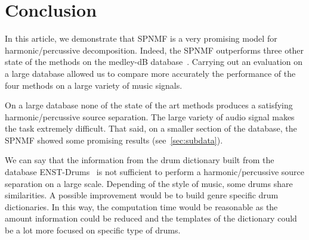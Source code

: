 \section{Conclusion}
\label{sec:conc}

In this article, we demonstrate that SPNMF is a very promising model for harmonic/percussive decomposition. Indeed, the SPNMF outperforms three other state of the methods on the medley-dB database~\cite{bittner2014medleydb}. Carrying out an evaluation on a large database allowed us to compare more accurately the performance of the four methods on a large variety of music signals. 

On a large database none of the state of the art methods produces a satisfying harmonic/percussive source separation. The large variety of audio signal makes the task extremely difficult. That said, on a smaller section of the database, the SPNMF showed some promising results (see~\ref{sec:subdata}).

We can say that the information from the drum dictionary built from the database ENST-Drums~\cite{gillet2006enst} is not sufficient to perform a harmonic/percussive source separation on a large scale. Depending of the style of music, some drums share similarities. A possible improvement would be to build genre specific drum dictionaries. In this way, the computation time would be reasonable as the amount information could be reduced and the templates of the dictionary could be a lot more focused on specific type of drums. 


